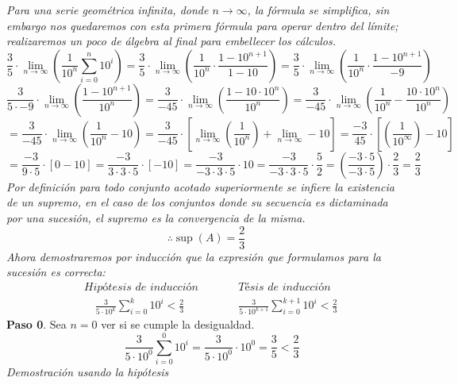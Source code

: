\documentclass{article}
\begin{document}
\textit{Para una serie geométrica infinita, donde \(n \to \infty\), la fórmula se simplifica, sin embargo nos quedaremos con esta primera fórmula para operar dentro del límite; realizaremos un poco de álgebra al final para embellecer los cálculos.}
\[
  \frac{3}{5} \cdot \lim_{n \to \infty} \left( \frac{1}{10^n}\sum\limits_{i=0}^n 10^i \right)
= \frac{3}{5} \cdot \lim_{n \to \infty} \left( \frac{1}{10^n} \cdot \frac{1 - 10^{n+1}}{1-10} \right)
= \frac{3}{5} \cdot \lim_{n \to \infty} \left( \frac{1}{10^n} \cdot \frac{1 - 10^{n+1}}{-9} \right) \]
\[
  \frac{3}{5 \cdot -9} \cdot \lim_{n \to \infty} \left( \frac{1 - 10^{n+1}}{10^n} \right)
= \frac{3}{-45} \cdot \lim_{n \to \infty} \left( \frac{1 - 10 \cdot 10^{n}}{10^n} \right)
= \frac{3}{-45} \cdot \lim_{n \to \infty} \left( \frac{1}{10^n} - \frac{10 \cdot 10^n}{10^n} \right)
\]
\[
    = \frac{3}{-45} \cdot \lim_{n \to \infty} \left( \frac{1}{10^n} - 10  \right)
    = \frac{3}{-45} \cdot \left[ \lim_{n \to \infty} \left( \frac{1}{10^n}\right) + \lim_{n \to \infty} -10 \right]
    = \frac{-3}{45} \cdot \left[ \left( \frac{1}{10^\infty}\right) - 10 \right]
\]
\[
    = \frac{-3}{9 \cdot 5} \cdot \left[ 0 - 10 \right]
    = \frac{-3}{3 \cdot 3 \cdot 5} \cdot \left[ -10 \right]
    = \frac{-3}{-3 \cdot 3 \cdot 5} \cdot 10
    = \frac{-3}{-3 \cdot 3 \cdot 5} \cdot \frac{5}{2}
    = \left( \frac{-3 \cdot 5}{-3 \cdot 5} \right) \cdot \frac{2}{3}
    = \frac{2}{3}
\]
\textit{Por definición para todo conjunto acotado superiormente se infiere la existencia de un supremo, en el caso de los conjuntos donde su secuencia es dictaminada por una sucesión, el supremo es la convergencia de la misma.}\\
\[ \therefore \sup(A) = \frac{2}{3}\]
\textit{Ahora demostraremos por inducción que la expresión que formulamos para la sucesión es correcta:}
\begin{align*}
    &\textit{Hipótesis de inducción} \quad && \quad  \textit{Tésis de inducción} \\
    & \quad \frac{3}{5 \cdot 10^k}\sum\limits_{i=0}^k 10^i < \frac{2}{3} && \quad \frac{3}{5 \cdot 10^{k+1}}\sum\limits_{i=0}^{k+1} 10^i < \frac{2}{3}
\end{align*}
\textbf{Paso 0}. Sea \(n=0\) ver si se cumple la desigualdad.
\[ \quad \frac{3}{5 \cdot 10^0}\sum\limits_{i=0}^0 10^i = \frac{3}{5 \cdot 10^0} \cdot 10^0 = \frac{3}{5} < \frac{2}{3} \]
\textit{Demostración usando la hipótesis}
\end{document}
